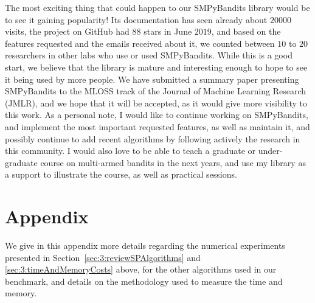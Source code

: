 The most exciting thing that could happen to our SMPyBandits library would be to see it gaining popularity!
Its documentation has seen already about $20000$ visits, the project on GitHub had $88$ stars in June $2019$, and based on the features requested and the emails received about it, we counted between $10$ to $20$ researchers in other labs who use or used SMPyBandits.
While this is a good start, we believe that the library is mature and interesting enough to hope to see it being used by more people.
%
We have submitted a summary paper presenting SMPyBandits \cite{SMPyBanditsJMLR} to the MLOSS track of the Journal of Machine Learning Research (JMLR), and we hope that it will be accepted, as it would give more visibility to this work.
%
As a personal note, I would like to continue working on SMPyBandits, and implement the most important requested features, as well as maintain it, and possibly continue to add recent algorithms by following actively the research in this community.
I would also love to be able to teach a graduate or under-graduate course on multi-armed bandits in the next years, and use my library as a support to illustrate the course, as well as practical sessions.


\newpage  %
\section{Appendix}
\label{sec:3:appendix}

We give in this appendix more details regarding the numerical experiments presented in Section~\ref{sec:3:reviewSPAlgorithms} and \ref{sec:3:timeAndMemoryCosts} above,
for the other algorithms used in our benchmark,
and details on the methodology used to measure the time and memory.



